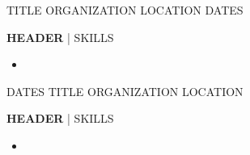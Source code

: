
\begin{cventries}

	\cventry
	{TITLE} %
	{ORGANIZATION} %
	{LOCATION} %
	{DATES} %
	{
		\begin{cvitems} %
			\item {\textbf{HEADER} | {\color{awesome}SKILLS}
				\begin{itemize}[noitemsep,wide=0pt, leftmargin=\dimexpr{} + 2\relax]
					\item[\textbullet]{}
				\end{itemize}}
		\end{cvitems}
	}
	
	\cventry
	{DATES} %
	{TITLE} %
	{ORGANIZATION} %
	{LOCATION} %
	{
		\begin{cvitems} %
			\item {\textbf{HEADER} | {\color{awesome}SKILLS}
				\begin{itemize}[noitemsep,wide=0pt, leftmargin=\dimexpr{} + 2\relax]
					\item[\textbullet]{}
				\end{itemize}}
		\end{cvitems}
	}
	
\end{cventries}